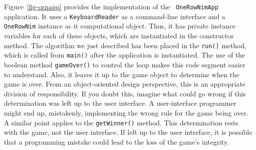 Figure~\ref{fig-ornapp} provides the implementation of the {\tt
OneRowNimApp} application.  It uses a {\tt KeyboardReader} as a
command-line interface and a {\tt OneRowNim} instance as it computational
object. Thus, it has private instance variables for each of these
objects, which are instantiated in the constructor method.
The algorithm we just described has been placed in the {\tt run()}
method, which is called from {\tt main()} after the application is
instantiated. The use of the boolean method {\tt gameOver()} to control
the loop makes this code segment easier to understand. Also, it
leaves it up to the game object to determine when the game is over.
From an object-oriented design perspective, this is an appropriate
division of responsibility.  If you doubt this, imagine what could go
wrong if this determination was left up to the user interface. A
user-interface programmer might end up, mistakenly, implementing the
wrong rule for the game being over. A similar point applies to the
{\tt getWinner()} method. This determination rests with the game, not
the user interface. If left up to the user interface, it is possible
that a programming mistake could lead to the loss of the game's
integrity.

